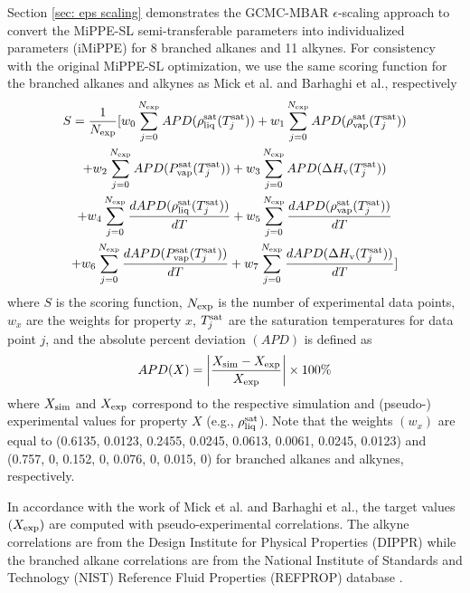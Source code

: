 \documentclass[journal=jced,manuscript=article]{achemso}
\begin{document}
Section \ref{sec: eps scaling} demonstrates the GCMC-MBAR $\epsilon$-scaling approach to convert the MiPPE-SL semi-transferable parameters into individualized parameters (iMiPPE) for 8 branched alkanes and 11 alkynes. For consistency with the original MiPPE-SL optimization, we use the same scoring function for the branched alkanes and alkynes as Mick et al. and Barhaghi et al., respectively
\begin{multline} \label{eq: Score}
S= \frac{1}{N_{\rm exp}} [ w_0 \sum_{j=0}^{N_{\rm exp}} APD(\rho_{\rm liq}^{\rm sat}(T^{\rm sat}_j)) + w_1 \sum_{j=0}^{N_{\rm exp}} APD(\rho_{\rm vap}^{\rm sat}(T^{\rm sat}_j)) \\ + w_2 \sum_{j=0}^{N_{\rm exp}} APD(P_{\rm vap}^{\rm sat}(T^{\rm sat}_j)) + w_3 \sum_{j=0}^{N_{\rm exp}} APD(\Delta H_{\rm v} (T^{\rm sat}_j)) \\ + w_4 \sum_{j=0}^{N_{\rm exp}} \frac{d APD(\rho_{\rm liq}^{\rm sat}(T^{\rm sat}_j))}{dT} + w_5 \sum_{j=0}^{N_{\rm exp}} \frac{d APD(\rho_{\rm vap}^{\rm sat}(T^{\rm sat}_j))}{dT} \\ + w_6 \sum_{j=0}^{N_{\rm exp}} \frac{d APD(P_{\rm vap}^{\rm sat}(T^{\rm sat}_j))}{dT} + w_7 \sum_{j=0}^{N_{\rm exp}} \frac{d APD(\Delta H_{\rm v} (T^{\rm sat}_j))}{dT} ]
\end{multline}
where $S$ is the scoring function, $N_{\rm exp}$ is the number of experimental data points, $w_{x}$ are the weights for property $x$, $T^{\rm sat}_j$ are the saturation temperatures for data point $j$, and the absolute percent deviation $(APD)$ is defined as
\begin{equation} \label{eq: APD}
APD(X) = \left| \frac{X_{\rm sim} - X_{\rm exp}}{X_{\rm exp}} \right| \times 100 \% 
\end{equation}
where $X_{\rm sim}$ and $X_{\rm exp}$ correspond to the respective simulation and (pseudo-) experimental values for property $X$ (e.g., $\rho_{\rm liq}^{\rm sat}$). Note that the weights $(w_x)$ are equal to (0.6135, 0.0123, 0.2455, 0.0245, 0.0613, 0.0061, 0.0245, 0.0123) and (0.757, 0, 0.152, 0, 0.076, 0, 0.015, 0) for branched alkanes and alkynes, respectively.


In accordance with the work of Mick et al. and Barhaghi et al., the target values $(X_{\rm exp})$ are computed with pseudo-experimental correlations. The alkyne correlations are from the Design Institute for Physical Properties (DIPPR) \cite{DIPPR} while the branched alkane correlations are from the National Institute of Standards and Technology (NIST) Reference Fluid Properties (REFPROP) database \cite{LEMMON-RP10}.
\end{document}
